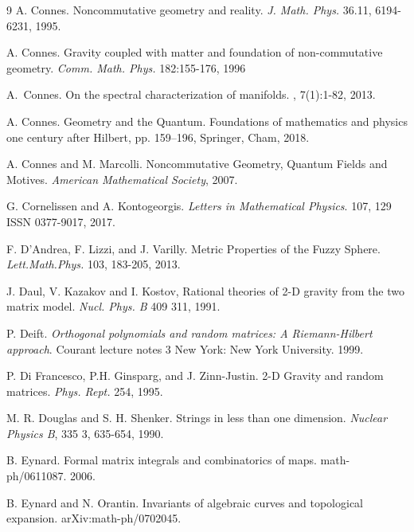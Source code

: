 \documentclass[10pt]{article}
\begin{document}
\begin{thebibliography}{9}
A. Connes. Noncommutative geometry and reality. \textit{J. Math. Phys.} 36.11,  6194-6231, 1995.

A. Connes. Gravity coupled with matter and foundation of non-commutative geometry. \textit{Comm. Math. Phys.}  182:155-176, 1996

A.~Connes.
\newblock On the spectral characterization of manifolds.
, 7(1):1-82, 2013.

A. Connes. Geometry and the Quantum. Foundations of mathematics and physics one century after Hilbert, pp. 159–196, Springer, Cham, 2018.

A. Connes and M. Marcolli. Noncommutative Geometry, Quantum Fields and Motives.
\textit{American Mathematical Society}, 2007.

G. Cornelissen and A. Kontogeorgis.  \textit{Letters in Mathematical Physics}. 107, 129  ISSN 0377-9017, 2017. 

F. D'Andrea, F. Lizzi, and J. Varilly. Metric Properties of the Fuzzy Sphere.  \textit{Lett.Math.Phys.} 103, 183-205, 2013.

 J. Daul, V. Kazakov and I. Kostov, Rational theories of 2-D gravity from the two matrix
model. \textit{Nucl. Phys. B} 409 311, 1991.

P. Deift. \textit{Orthogonal polynomials and random matrices: A Riemann-Hilbert approach}.  Courant lecture notes 3 New York: New York University. 1999.

P. Di Francesco, P.H. Ginsparg, and J. Zinn-Justin. 2-D Gravity and random matrices.
\textit{Phys. Rept.} 254, 1995.

M. R. Douglas and S. H. Shenker.
Strings in less than one dimension.
\textit{Nuclear Physics B},
335 3, 635-654, 1990.



B. Eynard. Formal matrix integrals and combinatorics of maps.  math-ph/0611087. 2006.

B. Eynard and N. Orantin. Invariants of algebraic curves and topological expansion. 	arXiv:math-ph/0702045.


\end{thebibliography}
\end{document}
